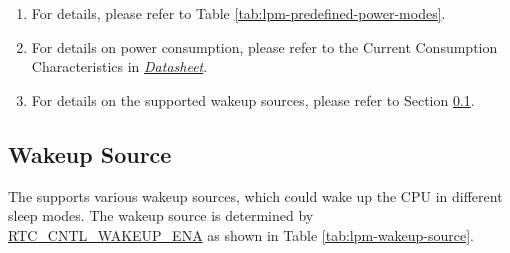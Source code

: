 \documentclass[main\_\_EN.tex]{subfiles}
\begin{document}
\begin{tiplisting}
\vspace{-2em}
\label{other:lpm-predefined-modes-notes}
\begin{enumerate}
    \item For details, please refer to Table \ref{tab:lpm-predefined-power-modes}.
    \item For details on power consumption, please refer to the Current Consumption Characteristics in \href{https://www.espressif.com/sites/default/files/documentation/\chipname{}_datasheet_en.pdf}{\it{\chipname{} Datasheet}}.
    \item For details on the supported wakeup sources, please refer to Section \ref{sec:lpm-wakeup-source}.
\end{enumerate}
\end{tiplisting}



\subsection{Wakeup Source}\label{sec:lpm-wakeup-source}

The \chipname{} supports various wakeup sources, which could wake up the CPU in different sleep modes. The wakeup source is determined by \hyperref[fielddesc:RTCCNTLWAKEUPENA]{RTC\_CNTL\_WAKEUP\_ENA} as shown in Table \ref{tab:lpm-wakeup-source}.
\end{document}
